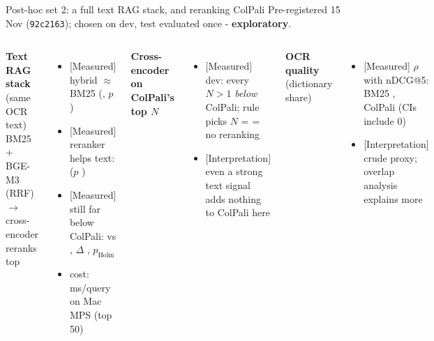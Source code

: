 \documentclass[aspectratio=169,11pt]{beamer}
\newcommand{\lbl}[2]{\textsf{\scriptsize\textcolor{#1}{[#2]}}}
\newcommand{\Mea}{\lbl{bgAqua}{Measured}}
\newcommand{\Int}{\lbl{tagI}{Interpretation}}
\begin{document}
\begin{frame}{Post-hoc set 2: a full text RAG stack, and reranking ColPali}
\small Pre-registered 15 Nov (\texttt{92c2163}); chosen on dev, test evaluated once - \textbf{exploratory}.\\[6pt]
\begin{columns}[T]
\textbf{Text RAG stack} (same OCR text)\\[2pt]
BM25 + BGE-M3 (RRF) $\rightarrow$ cross-encoder reranks top \nTrr{}
\begin{itemize}
  \item \Mea{} hybrid $\approx$ BM25 (\deltaThybA{}, $p$ \pThybA{})
  \item \Mea{} reranker helps text: \deltaTrrThyb{} ($p$ \pTrrThyb{})
  \item \Mea{} still far below ColPali: \testTrr{} vs \testB{}, $\Delta$ \deltaTrr{}, $p_\text{Holm}$ \pHolmTrr{}
  \item cost: \latTrr{}\,ms/query on Mac MPS (top 50)
\end{itemize}
\textbf{Cross-encoder on ColPali's top $N$}
\begin{itemize}
  \item \Mea{} dev: every $N>1$ \emph{below} ColPali; rule picks $N$ = \nBce{} = no reranking
  \item \Int{} even a strong text signal adds nothing to ColPali here
\end{itemize}
\textbf{OCR quality} (dictionary share)
\begin{itemize}
  \item \Mea{} $\rho$ with nDCG@5: BM25 \ocrRhoA{}, ColPali \ocrRhoB{} (CIs include 0)
  \item \Int{} crude proxy; overlap analysis explains more
\end{itemize}
\end{columns}
\end{frame}
\end{document}
